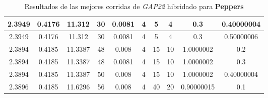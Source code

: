 \begin{table}[h!]
\begin{center}
\begin{tabular}{|c|c|c|c|c|c|c|c|c|c|}
        \hline
        \hline
            2.3949 & 0.4176  & 11.312 & 30 & 0.0081 & 4 & 5 & 4 & 0.3 & 0.40000004\\
        \hline
        \hline
            2.3949 & 0.4176  & 11.312 & 30 & 0.0081 & 4 & 5 & 4 & 0.3 & 0.50000006\\
        \hline
        \hline
            2.3894 & 0.4185  & 11.3387 & 48 & 0.008 & 4 & 15 & 10 & 1.0000002 & 0.2\\
        \hline
        \hline
            2.3894 & 0.4185  & 11.3387 & 48 & 0.0081 & 4 & 15 & 10 & 1.0000002 & 0.3\\
        \hline
        \hline
            2.3894 & 0.4185  & 11.3387 & 50 & 0.008 & 4 & 15 & 10 & 1.0000002 & 0.40000004\\
        \hline
        \hline
            2.3896 & 0.4185  & 11.6296 & 56 & 0.008 & 4 & 40 & 20 & 0.90000015 & 0.1\\
        \hline
        \end{tabular}
        \caption{Resultados de las mejores corridas de \emph{GAP22} hibridado para {\bf Peppers}}
        \label{tb:tableGAP22}
    \end{center}
\end{table}
